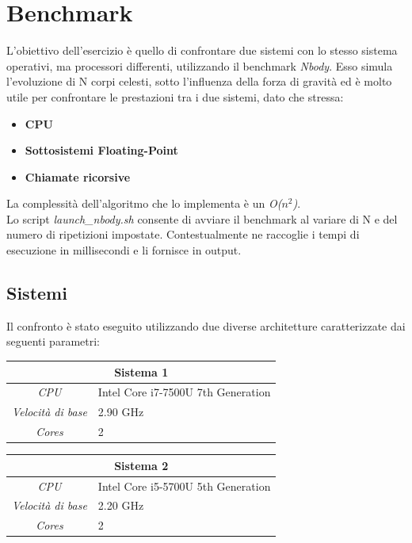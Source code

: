 \chapter{Benchmark}
L'obiettivo dell'esercizio è quello di confrontare due sistemi con lo stesso sistema operativi, ma processori differenti, utilizzando il benchmark \textit{Nbody}. Esso simula l'evoluzione di N corpi celesti, sotto l'influenza della forza di gravità ed è molto utile per confrontare le prestazioni tra i due sistemi, dato che stressa:
\begin{itemize}
	\item \textbf{CPU}
	\item \textbf{Sottosistemi Floating-Point}
	\item \textbf{Chiamate ricorsive}
\end{itemize}
La complessità dell'algoritmo che lo implementa è un \textit{O($n^2$)}.
\\
Lo script \textit{launch\_nbody.sh} consente di avviare il benchmark al variare di N e del numero di ripetizioni impostate. Contestualmente ne raccoglie i tempi di esecuzione in millisecondi e li fornisce in output.

\section{Sistemi}
Il confronto è stato eseguito utilizzando due diverse architetture caratterizzate dai seguenti parametri:
\begin{table}[H]
	\begin{center}
		\begin{tabularx}{0.49\textwidth}{|c|X|}
			\hline
			\multicolumn{2}{|c|}{\textbf{Sistema 1}} \\
			\hline
			\textit{CPU} & Intel Core i7-7500U 7th Generation \\
			\hline
			\textit{Velocità di base} & 2.90 GHz \\
			\hline
			\textit{Cores} & 2 \\
			\hline
		\end{tabularx}
		\begin{tabularx}{0.49\textwidth}{|c|X|}
			\hline
			\multicolumn{2}{|c|}{\textbf{Sistema 2}} \\
			\hline
			\textit{CPU} & Intel Core i5-5700U 5th Generation \\
			\hline
			\textit{Velocità di base} & 2.20 GHz \\
			\hline
			\textit{Cores} & 2 \\
			\hline
		\end{tabularx}
	\end{center}
\end{table}

